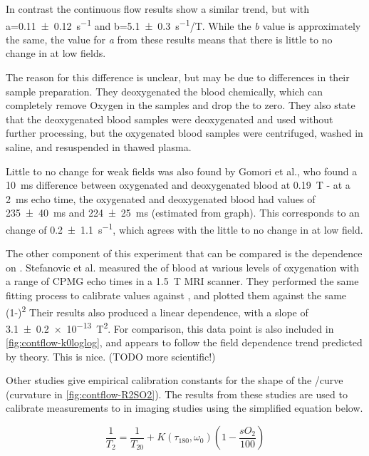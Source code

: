 In contrast the continuous flow results show a similar trend, but with a=\SI{0.11\pm0.12}{s^{-1}} and b=\SI{5.1\pm0.3}{s^{-1}/T}.
While the \textit{b} value is approximately the same, the value for \textit{a} from these results means that there is little to no change in \Rtwo at low fields.

The reason for this difference is unclear, but may be due to differences in their sample preparation.
They deoxygenated the blood chemically, which can completely remove Oxygen in the samples and drop the \SOtwo to zero.
They also state that the deoxygenated blood samples were deoxygenated and used without further processing, but the oxygenated blood samples were centrifuged, washed in saline, and resuspended in thawed plasma.

Little to no change for weak \Bzero fields was also found by Gomori et al., who found a \SI{10}{ms} \Ttwo difference between oxygenated and deoxygenated blood at \SI{0.19}{T} \cite{GomoriNMRRelaxationTimes1987} -
at a \SI{2}{ms} echo time, the oxygenated and deoxygenated blood had \Ttwo values of \SI{235\pm40}{ms} and \SI{224\pm25}{ms} (estimated from graph).
This corresponds to an \Rtwo change of \SI{0.2\pm1.1}{s^{-1}}, which agrees with the little to no change in \Rtwo at low field.

The other component of this experiment that can be compared is the dependence on \SOtwo.
Stefanovic et al. measured the \Ttwo of blood at various levels of oxygenation with a range of CPMG echo times in a \SI{1.5}{T} MRI scanner\cite{StefanovicHumanwholebloodrelaxometry2004}.
They performed the same \Kzero fitting process to calibrate \Kzero values against \SOtwo, and plotted them against the same (1-\SOtwo)\textsuperscript{2}
Their results also produced a linear dependence, with a slope of \SI{3.1\pm0.2 e-13}{T^2}.
For comparison, this data point is also included in \autoref{fig:contflow-k0loglog}, and appears to follow the field dependence trend predicted by theory.
This is nice. (TODO more scientific!)

Other studies give empirical calibration constants for the shape of the \Rtwo/\SOtwo curve (curvature in \autoref{fig:contflow-R2SO2}).
The results from these studies are used to calibrate \Ttwo measurements to \SOtwo in imaging studies using the simplified equation below.

\begin{equation}
\frac{1}{T_2} = \frac{1}{T_{20}} + K\left(\tau_{180},\omega_0\right)\left(1 - \frac{sO_2}{100}\right)
\label{eq:quadmodel}
\end{equation}

